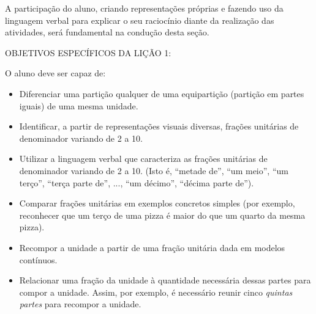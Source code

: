 A participação do aluno, criando representações próprias e fazendo uso da linguagem verbal para explicar o seu raciocínio diante da realização das atividades, será fundamental na condução desta seção.
\vspace{.15cm}

\noindent OBJETIVOS ESPECÍFICOS DA LIÇÃO 1:
\vspace{.15cm}

\noindent O aluno deve ser capaz de:
\begin{itemize}
  \item  Diferenciar uma partição qualquer de uma equipartição (partição em partes iguais) de uma mesma unidade.
  \item  Identificar, a partir de representações visuais diversas, frações unitárias de denominador variando de 2 a 10.
  \item  Utilizar a linguagem verbal que caracteriza as frações unitárias de denominador variando de 2 a 10. (Isto é, ``metade de'', ``um meio'', ``um terço'', ``terça parte de'', ..., ``um décimo'', ``décima parte de'').
  \item  Comparar frações unitárias em exemplos concretos simples (por exemplo, reconhecer que um terço de uma pizza é maior do que um quarto da mesma pizza).
  \item  Recompor a unidade a partir de uma fração unitária dada em modelos contínuos.
  \item  Relacionar uma fração da unidade à quantidade necessária dessas partes para compor a unidade. Assim, por exemplo, é necessário reunir cinco {\it quintas partes} para recompor a unidade.
\end{itemize}

